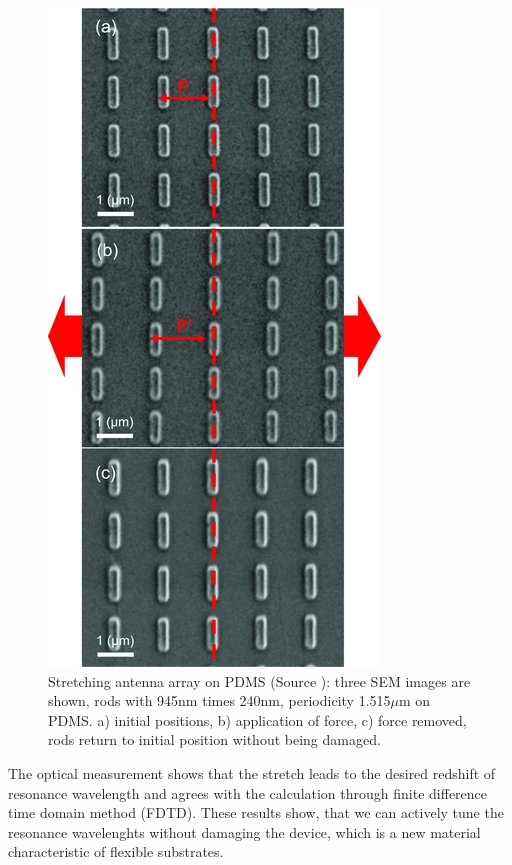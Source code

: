\documentclass[journal, a4paper]{IEEEtran}
\begin{document}
\begin{figure}[hbt!]
\begin{center}
\includegraphics[width=0.65\columnwidth]{13stretch.jpg}
\caption{Stretching antenna array on PDMS (Source \cite{paper}): three SEM images are shown, rods with 945nm times 240nm, periodicity 1.515$\mu$m on PDMS. a) initial positions, b) application of force, c) force removed, rods return to initial position without being damaged.}
\label{fig:stretch}
\end{center}
\end{figure} 

The optical measurement shows that the stretch leads to the desired redshift of resonance wavelength and agrees with the calculation through finite difference time domain method (FDTD). These results show, that we can actively tune the resonance wavelenghts without damaging the device, which is a new material characteristic of flexible substrates.
\end{document}
